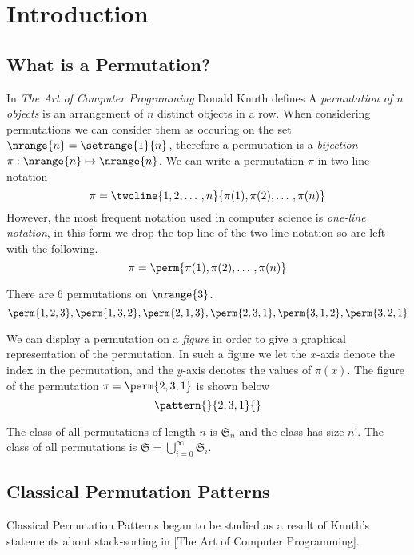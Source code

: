 \section{Introduction}
\subsection{What is a Permutation?}
In \emph{The Art of Computer Programming} Donald Knuth defines
A \emph{permutation of \(n\) objects} is an arrangement of \(n\) distinct
objects in a row. When considering permutations we can consider them as
occuring on the set \(\nrange{n} = \setrange{1}{n}\), therefore a permutation
is a \emph{bijection} \(\pi:\nrange{n} \mapsto \nrange{n}\). We can write a
permutation \(\pi\) in two line notation
\begin{equation*}
\pi = \twoline{1,2,\dotso,n}{\pi(1),\pi(2),\dotso,\pi(n)}
\end{equation*}
However, the most frequent notation used in computer science is
\emph{one-line notation}, in this form we drop the top line of the two line
notation so are left with the following.
\begin{equation*}
\pi = \perm{\pi(1),\pi(2),\dotso,\pi(n)}
\end{equation*}

\begin{example}
There are 6 permutations on \(\nrange{3}\).
\begin{equation*}
\perm{1,2,3},\perm{1,3,2},\perm{2,1,3},\perm{2,3,1}, \perm{3,1,2}, \perm{3,2,1}
\end{equation*}
\end{example}

We can display a permutation on a \emph{figure} in order to give a graphical
representation of the permutation. In such a figure we let the \(x\)-axis
denote the index in the permutation, and the \(y\)-axis denotes the values of
\(\pi(x)\). The figure of the permutation \(\pi = \perm{2,3,1}\) is shown below
\begin{equation*}
    \pattern{}{2,3,1}{}
\end{equation*}

The class of all permutations of length \(n\) is \(\mathfrak{S}_n\) and
the class has size \(n!\). The class of all permutations is
\(\mathfrak{S}=\bigcup_{i=0}^{\infty}\mathfrak{S}_i\).

\subsection{Classical Permutation Patterns}
Classical Permutation Patterns began to be studied as a result of Knuth's
statements about stack-sorting in [The Art of Computer Programming].

